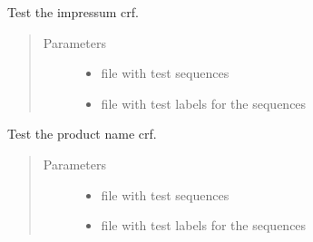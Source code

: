 \documentclass[letterpaper,10pt,english]{sphinxmanual}
\begin{document}

\begin{fulllineitems}
\label{\detokenize{api:backend.test_impressum}}
Test the impressum crf.
\begin{quote}\begin{description}
\item[{Parameters}] \leavevmode\begin{itemize}
\item {} 
 \textendash{} file with test sequences

\item {} 
 \textendash{} file with test labels for the sequences

\end{itemize}

\end{description}\end{quote}

\end{fulllineitems}


\begin{fulllineitems}
\label{\detokenize{api:backend.test_product_name}}
Test the product name crf.
\begin{quote}\begin{description}
\item[{Parameters}] \leavevmode\begin{itemize}
\item {} 
 \textendash{} file with test sequences

\item {} 
 \textendash{} file with test labels for the sequences

\end{itemize}

\end{description}\end{quote}

\end{fulllineitems}
\end{document}

